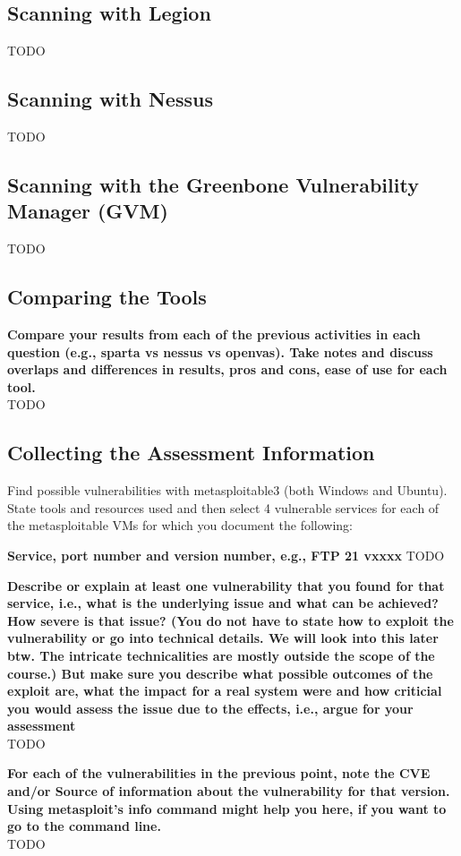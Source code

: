 \subsection*{Scanning with Legion}
TODO

\subsection*{Scanning with Nessus}
TODO

\subsection*{Scanning with the Greenbone Vulnerability Manager (GVM)}
TODO

\subsection*{Comparing the Tools}
\textbf{\dag Compare your results from each of the previous activities in each question (e.g., sparta vs nessus vs openvas). Take notes and discuss overlaps and differences in results, pros and cons, ease of use for each tool.}\\
TODO

\subsection*{Collecting the Assessment Information}
Find possible vulnerabilities with metasploitable3 (both Windows and Ubuntu).
State tools and resources used and then select 4 vulnerable services for each of the metasploitable VMs for which you document the following:

\textbf{\dag Service, port number and version number, e.g., FTP 21 vxxxx}
TODO

\textbf{\dag Describe or explain at least one vulnerability that you found for that service, i.e., what is the underlying issue and what can be achieved? How severe is that issue? (You do not have to state how to exploit the vulnerability or go into technical details. We will look into this later btw. The intricate technicalities are mostly outside the scope of the course.) But make sure you describe what possible outcomes of the exploit are, what the impact for a real system were and how criticial you would assess the issue due to the effects, i.e., argue for your assessment}\\
TODO

\textbf{\dag For each of the vulnerabilities in the previous point, note the CVE and/or Source of information about the vulnerability for that version. Using metasploit’s info command might help you here, if you want to go to the command line.}\\
TODO

